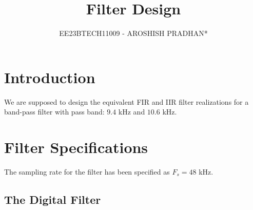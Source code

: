 \documentclass{article}
\begin{document}
\title{Filter Design}

\author{EE23BTECH11009 - AROSHISH PRADHAN*}

\maketitle
\section{Introduction}
We are supposed to design the equivalent FIR and IIR filter realizations for a band-pass filter with pass band: $9.4$ kHz and $10.6$ kHz.

\section{Filter Specifications}
The sampling rate for the filter has been specified as $F_s =  48$ kHz.	

\subsection{The Digital Filter}
\end{document}
